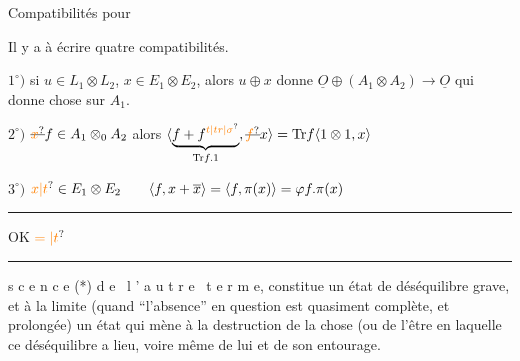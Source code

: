 
Compatibilités pour



Il y a à écrire quatre compatibilités.

$1^\circ)$ si $u\in L_1\otimes L_2$, $x\in E_1\otimes E_2$, alors $u\oplus x$ donne  $\underline{O}\oplus(A_1\otimes A_2)\longrightarrow\underline{O}$ qui donne  chose sur $A_1$.

$2^\circ)$ $\deleted{\unsure{x}}f\in A_1\otimes_0 A_2$ alors $\langle\underbrace{f+f^{\unsure{t|tr|\sigma}}}_{\mathrm{Tr}f.1},\deleted{\unsure{f}}x\rangle=\mathrm{Tr}f\langle1\otimes1,x\rangle$

$3^\circ)$ $\unsure{x|t}\in E_1\otimes E_2\qquad \langle f,x+\overline{x}\rangle=\langle f,\pi(x)\rangle={\varphi}f.\pi(x)$

\noindent\rule{.20\linewidth}{.4pt}\par
OK \hspace{6em}$\unsure{=|t}$\par
\hspace{9em}\par
\noindent\rule{.85\linewidth}{.4pt}


s c e n c e (*) d e \ l ' a u t r e \ t e r m e, constitue un état de déséquilibre grave, et à la limite (quand ``l'absence'' en question est quasiment complète, et prolongée) un état qui mène à la destruction de la chose (ou de l'être\unsure{)|:} en laquelle ce déséquilibre a lieu, voire même de lui et de son entourage.

